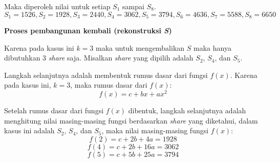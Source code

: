 Maka diperoleh nilai untuk setiap \begin{math}S_1\end{math} sampai \begin{math}S_8\end{math}.
\begin{displaymath}
	S_1 = 1526, S_2 = 1928, S_3 = 2440, S_4 = 3062, S_5 = 3794, S_6 = 4636, S_7 = 5588, S_8 = 6650
\end{displaymath}

\begin{flushleft}
	\textbf{Proses pembangunan kembali (rekonstruksi \textit{S})}
\end{flushleft}

Karena pada kasus ini \begin{math}k=3\end{math} maka untuk mengembalikan \begin{math}S\end{math} maka hanya dibutuhkan 3 \textit{share} saja. Misalkan \textit{share} yang dipilih adalah \begin{math}S_2\end{math}, \begin{math}S_4\end{math}, dan \begin{math}S_5\end{math}.

Langkah selanjutnya adalah membentuk rumus dasar dari fungsi \begin{math}f(x)\end{math}. Karena pada kasus ini, \begin{math}k=3\end{math}, maka rumus dasar dari \begin{math}f(x)\end{math}:
\begin{displaymath}
	f(x) = c + bx + ax^2
\end{displaymath}

Setelah rumus dasar dari fungsi \begin{math}f(x)\end{math} dibentuk, langkah selanjutnya adalah menghitung nilai masing-masing fungsi berdasarkan \textit{share} yang diketahui, dalam kasus ini adalah \begin{math}S_2\end{math}, \begin{math}S_4\end{math}, dan \begin{math}S_5\end{math}, maka nilai masing-masing fungsi \begin{math}f(x)\end{math}:
\begin{displaymath}
	f(2) = c + 2b + 4a = 1928
\end{displaymath}
\begin{displaymath}
	f(4) = c + 2b + 16a = 3062
\end{displaymath}
\begin{displaymath}
	f(5) = c + 5b + 25a = 3794
\end{displaymath}

